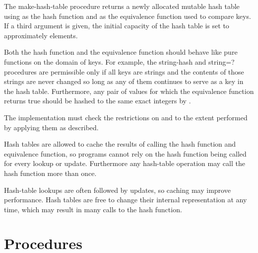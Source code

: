 \begin{entry}{%
}

The {\cf make-hash-table} procedure returns a newly allocated mutable
hash table using  
as the hash function and  as the equivalence function used to 
compare keys.
If a third argument is given, the 
initial capacity of the hash table is set to approximately  elements.

Both the hash function  and the equivalence
function  should behave like pure functions
on the domain of keys.  For example, the {\cf string-hash}
and {\cf string=?} procedures are permissible only if all
keys are strings and the contents of those strings are never
changed so long as any of them continues to serve as a key in
the hash table.  Furthermore, any pair of values for which
the equivalence function  returns true should
be hashed to the same exact integers by 
.

\implresp The implementation must check the restrictions on
 and  to the extent performed by
applying them as described.

\begin{note}
Hash tables are allowed to cache the results of calling the
hash function and equivalence function, so programs cannot
rely on the hash function being called for every lookup or
update.  Furthermore any hash-table operation may call the
hash function more than once.
\end{note}

\begin{rationale}
Hash-table lookups are often followed by updates, so caching
may improve performance.  Hash tables are free to change
their internal representation at any time, which may result
in many calls to the hash function.
\end{rationale}

\end{entry}

\section{Procedures}

